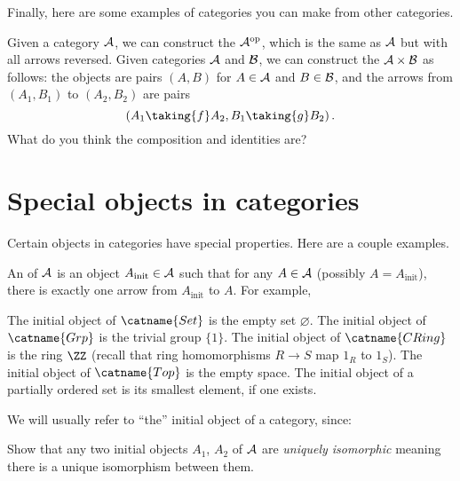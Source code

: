 Finally, here are some examples of categories you can make from other categories.
\begin{example}
	\listhack
	\begin{enumerate}[(a)]
		\ii Given a category $\AA$, we can construct the 
		$\AA\op$, which is the same as $\AA$ but with all arrows reversed.
		\ii Given categories $\AA$ and $\BB$, we can construct the  $\AA \times \BB$
		as follows: the objects are pairs $(A, B)$ for $A \in \AA$ and $B \in \BB$,
		and the arrows from $(A_1, B_1)$ to $(A_2, B_2)$
		are pairs \[ \left( A_1 \taking{f} A_2, B_1 \taking{g} B_2 \right). \]
		What do you think the composition and identities are?
	\end{enumerate}
\end{example}

\section{Special objects in categories}
Certain objects in categories have special properties.
Here are a couple examples.
\begin{example}
	An  of $\AA$ is an object
	$A_{\text{init}} \in \AA$ such that for any $A \in \AA$ (possibly $A = A_{\text{init}}$),
	there is exactly one arrow from $A_{\text{init}}$ to $A$.
	For example,
	\begin{enumerate}[(a)]
		\ii The initial object of $\catname{Set}$ is the empty set $\varnothing$.
		\ii The initial object of $\catname{Grp}$ is the trivial group $\{1\}$.
		\ii The initial object of $\catname{CRing}$ is the ring $\ZZ$
		(recall that ring homomorphisms $R \to S$ map $1_R$ to $1_S$).
		\ii The initial object of $\catname{Top}$ is the empty space.
		\ii The initial object of a partially ordered set is its smallest element, if one exists.
	\end{enumerate}
\end{example}

We will usually refer to ``the'' initial object of a category, since:
\begin{exercise}
	[Important!]
	Show that any two initial objects $A_1$, $A_2$ of $\AA$ are \emph{uniquely isomorphic}
	meaning there is a unique isomorphism between them.
\end{exercise}

